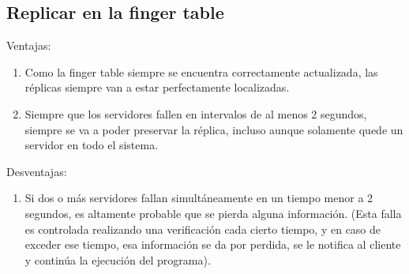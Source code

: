 \documentclass[10pt, a4paper]{article}
\begin{document}
    \subsection{Replicar en la finger table}
    Ventajas:
    \begin{enumerate}
    	\item Como la finger table siempre se encuentra correctamente actualizada, las réplicas siempre van a estar perfectamente localizadas.
    	\item Siempre que los servidores fallen en intervalos de al menos 2 segundos, siempre se va a poder preservar la réplica, incluso aunque solamente quede un servidor en todo el sistema.
    \end{enumerate}
    Desventajas:
    \begin{enumerate}
    	\item Si dos o más servidores fallan simultáneamente en un tiempo menor a 2 segundos, es altamente probable que se pierda alguna información. (Esta falla es controlada realizando una verificación cada cierto tiempo, y en caso de exceder ese tiempo, esa información se da por perdida, se le notifica al cliente y continúa la ejecución del programa).
    \end{enumerate}
 
    
    
    
    
\end{document}
